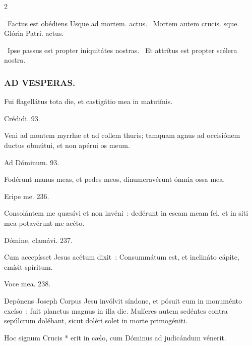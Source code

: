 \documentclass[9pt,twoside]{extarticle}
\begin{document}
\begin{multicols}{2}
\begin{tightlist}{}
\item {}~Factus est obédiens \textred{*} Usque ad mortem. actus. ~Mortem autem crucis. sque. Glória Patri. actus.
\item {}~Ipse passus est propter iniquitátes nostras. ~Et attrítus est propter scélera nostra.
\end{tightlist}

\subsubsection*{\center \textsc{AD VESPERAS.}}
\begin{tightlist}{}
\item {} Fui flagellátus tota die, et castigátio mea in matutínis.
\item {} Crédidi. 93.
\item {} Veni ad montem myrrhæ et ad collem thuris; tamquam agnus ad occisiónem ductus obmútui, et non apérui os meum.
\item {} Ad Dóminum. 93. 
\item {} Fodérunt manus meas, et pedes meos, dinumeravérunt ómnia ossa mea.
\item {} Eripe me. 236. 
\item {} Consolántem me quæsívi et non invéni~: dedérunt in escam meam fel, et in siti mea potavérunt me acéto.
\item {} Dómine, clamávi. 237. 
\item {} Cum accepísset Jesus acétum dixit~: Consummátum est, et inclináto cápite, emísit spíritum.
\item {} Voce mea. 238.
\item {}
\item {} Depónens Joseph Corpus Jesu invólvit síndone, et pósuit eum in monuménto excíso~: fuit planctus magnus in illa die. Mulíeres autem sedéntes contra sepúlcrum dolébant, sicut doléri solet in morte primogéniti.
\item {}
\item {} Hoc signum Crucis * erit in cælo, cum Dóminus ad judicándum vénerit.
\end{tightlist}


\end{multicols}
\end{document}
